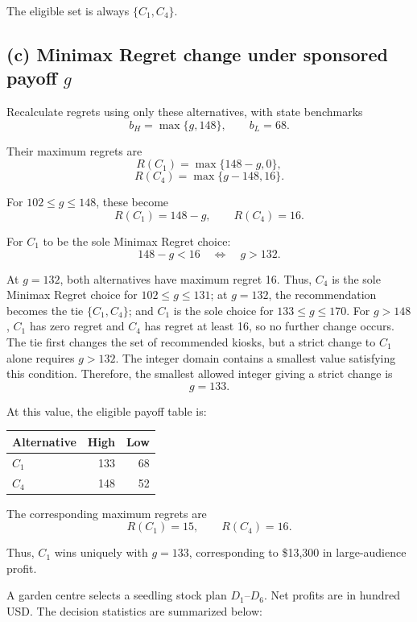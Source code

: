 The eligible set is always $\{C_1,C_4\}$.
\secInicio[sec:q2]

\label{sol:q2c}
\subsection*{(c) Minimax Regret change under sponsored payoff $g$ }

Recalculate regrets using only these alternatives,
with state benchmarks
\[
b_H=\max\{g,148\},\qquad b_L=68.
\]

Their maximum regrets are
\[
R(C_1)=\max\{148-g,0\},
\]
\[
R(C_4)=\max\{g-148,16\}.
\]

For $102\le g\le148$, these become
\[
R(C_1)=148-g,\qquad R(C_4)=16.
\]

For $C_1$ to be the sole Minimax Regret choice:
\[
148-g<16
\quad\Longleftrightarrow\quad g>132.
\]

At $g=132$, both alternatives have maximum regret 16.
Thus, $C_4$ is the sole Minimax Regret choice for $102\le g\le131$;
at $g=132$, the recommendation becomes the tie $\{C_1,C_4\}$;
and $C_1$ is the sole choice for $133\le g\le170$.
For $g>148$, $C_1$ has zero regret and $C_4$ has regret at least 16,
so no further change occurs.
The tie first changes the set of recommended kiosks, but a strict
change to $C_1$ alone requires $g>132$.
The integer domain contains a smallest value satisfying this condition.
Therefore, the smallest allowed integer giving a strict change is
\[
\boxed{g=133}.
\]

At this value, the eligible payoff table is:

\begin{center}\small\setlength{\tabcolsep}{4pt}
\begin{tabular}{lrr}\toprule
Alternative & High & Low\\ \midrule
$C_1$ & 133 & 68\\
$C_4$ & 148 & 52\\
\bottomrule
\end{tabular}
\end{center}

The corresponding maximum regrets are
\[
R(C_1)=15,\qquad R(C_4)=16.
\]

Thus, $C_1$ wins uniquely with $g=133$,
corresponding to \$13,300 in large-audience profit.
\secInicio[sec:q2]



A garden centre selects a seedling stock plan $D_1$--$D_6$. Net profits are in hundred USD. The decision statistics are summarized below:

